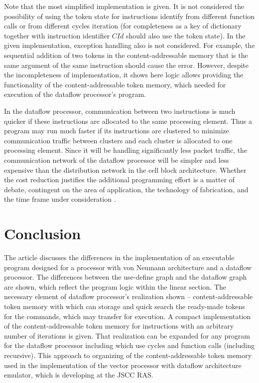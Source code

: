 \documentclass[
11pt,%
tightenlines,%
twoside,%
onecolumn,%
nofloats,%
nobibnotes,%
nofootinbib,%
superscriptaddress,%
noshowpacs,%
centertags]%
{revtex4}
\begin{document}
Note that the most simplified implementation is given.
It is not considered the possibility of using the token state for instructions identify from different function calls or from different cycles iteration (for completeness as a key of dictionary together with instruction identifier $CId$ should also use the token state).
In the given implementation, exception handling also is not considered.
For example, the sequential addition of two tokens in the content-addressable memory that is the same argument of the same instruction should cause the error.
However, despite the incompleteness of implementation, it shows here logic allows providing the functionality of the content-addressable token memory, which needed for execution of the dataflow processor’s program.

In the dataflow processor, communication between two instructions is much quicker if these instructions are allocated to the same processing element.
Thus a program may run much faster if its instructions are clustered to minimize communication traffic between clusters and each cluster is allocated to one processing element.
Since it will be handling significantly less packet traffic, the communication network of the dataflow processor will be simpler and less expensive than the distribution network in the cell block architecture.
Whether the cost reduction justifies the additional programming effort is a matter of debate, contingent on the area of application, the technology of fabrication, and the time frame under consideration \cite{Dennis}.

\section{Conclusion}

The article discusses the differences in the implementation of an executable program designed for a processor with von Neumann architecture and a dataflow processor.
The differences between the use-define graph and the dataflow graph are shown, which reflect the program logic within the linear section.
The necessary element of dataflow processor’s realization shown -- content-addressable token memory with which can storage and quick search the ready-made tokens for the commands, which may transfer for execution.
A compact implementation of the content-addressable token memory for instructions with an arbitrary number of iterations is given.
That realization can be expanded for any program for the dataflow processor including which use cycles and function calls (including recursive).
This approach to organizing of the content-addressable token memory used in the implementation of the vector processor with dataflow architecture emulator, which is developing at the JSCC RAS.
\end{document}
